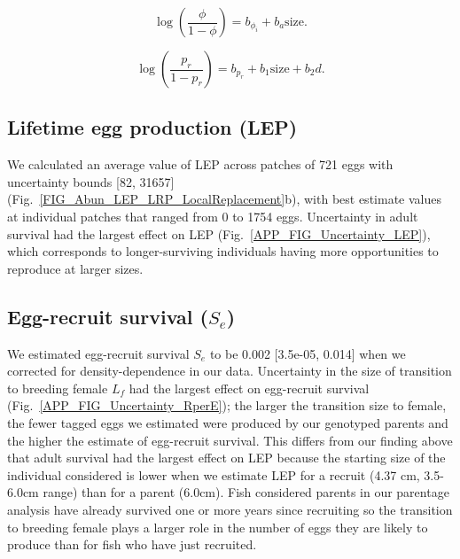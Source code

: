 \documentclass[12pt, oneside]{article}   	%
\begin{document}
\begin{equation}
\log(\frac{\phi}{1-\phi}) = b_{\phi_i} + b_a\text{size}. \label{APP_EQN_Survival}
\end{equation}

\begin{equation}
\log(\frac{p_r}{1-p_r}) = b_{p_r} + b_1\text{size} + b_2d. \label{APP_EQN_MARK_Recapture}
\end{equation}

\subsection{Lifetime egg production (LEP)} \label{APP_SEC_RESULTS_LEP}
We calculated an average value of LEP across patches of 721 eggs with uncertainty bounds [82, 31657] (Fig.\ \ref{FIG_Abun_LEP_LRP_LocalReplacement}b), with best estimate values at individual patches that ranged from 0 to 1754 eggs. Uncertainty in adult survival had the largest effect on LEP (Fig.\ \ref{APP_FIG_Uncertainty_LEP}), which corresponds to longer-surviving individuals having more opportunities to reproduce at larger sizes. 

\subsection{Egg-recruit survival ($S_e$)} \label{APP_SEC_RESULTS_Egg-recruit_survival}

We estimated egg-recruit survival $S_{e}$ to be 0.002 [3.5e-05, 0.014] when we corrected for density-dependence in our data. Uncertainty in the size of transition to breeding female $L_f$ had the largest effect on egg-recruit survival (Fig.\ \ref{APP_FIG_Uncertainty_RperE}); the larger the transition size to female, the fewer tagged eggs we estimated were produced by our genotyped parents and the higher the estimate of egg-recruit survival. This differs from our finding above that adult survival had the largest effect on LEP because the starting size of the individual considered is lower when we estimate LEP for a recruit (4.37 cm, 3.5-6.0cm range) than for a parent (6.0cm). Fish considered parents in our parentage analysis have already survived one or more years since recruiting so the transition to breeding female plays a larger role in the number of eggs they are likely to produce than for fish who have just recruited. 
\end{document}
